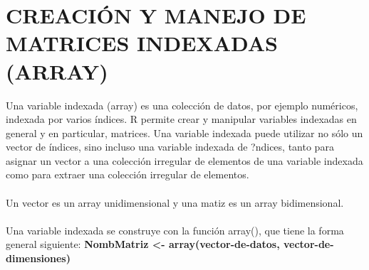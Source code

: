 \documentclass[12pt,letterpaper]{article}\usepackage[]{graphicx}\usepackage[]{color}
\begin{document}
\section{CREACI\'ON Y MANEJO DE MATRICES INDEXADAS (ARRAY)}
Una variable indexada (array) es una colecci\'on de datos, por ejemplo num\'ericos, indexada por varios \'indices. R permite crear y manipular variables indexadas en general y en particular, matrices. Una variable indexada puede utilizar no s\'olo un vector de \'indices, sino incluso una variable indexada de ?ndices, tanto para asignar un vector a una colecci\'on irregular de elementos de una variable indexada como para extraer una colecci\'on irregular de elementos.\\\\
Un vector es un array unidimensional y una matiz es un array bidimensional.\\\\
Una variable indexada se construye con la funci\'on array(), que tiene la forma general siguiente:
\textbf {NombMatriz <- array(vector-de-datos, vector-de-dimensiones)}
\end{document}
